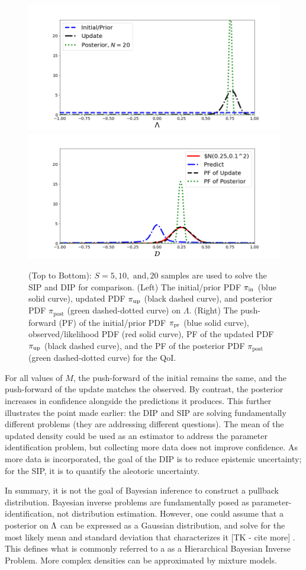 \begin{ex}
\begin{figure}[htbp]
   \includegraphics[width=0.49\linewidth]{figures/bip-vs-sip-20.png}
   \includegraphics[width=0.49\linewidth]{figures/bip-vs-sip-pf-20.png}
 \caption{(Top to Bottom): $S=5, 10, \text{ and}, 20$ samples are used to solve the SIP and DIP for comparison. (Left) The initial/prior PDF $\operatorname*{\pi_{in}}$ (blue solid curve), updated PDF $\operatorname*{\pi_{up}}$ (black dashed curve), and posterior PDF $\pi_\text{post}$ (green dashed-dotted curve) on $\Lambda$.
 (Right) The push-forward (PF) of the initial/prior PDF $\operatorname*{\pi_{pr}}$ (blue solid curve), observed/likelihood PDF (red solid curve), PF of the updated PDF $\operatorname*{\pi_{up}}$ (black dashed curve), and the PF of the posterior PDF $\pi_\text{post}$ (green dashed-dotted curve) for the QoI.}
 \label{fig:bayes-comparison-convergence}
\end{figure}

For all values of $M$, the push-forward of the initial remains the same, and the push-forward of the update matches the observed.
By contrast, the posterior increases in confidence alongside the predictions it produces.
This further illustrates the point made earlier: the DIP and SIP are solving fundamentally different problems (they are addressing different questions).
The mean of the updated density could be used as an estimator to address the parameter identification problem, but collecting more data does not improve confidence.
As more data is incorporated, the goal of the DIP is to reduce epistemic uncertainty; for the SIP, it is to quantify the aleotoric uncertainty.

\end{ex}





In summary, it is not the goal of Bayesian inference to construct a pullback distribution.
Bayesian inverse problems are fundamentally posed as parameter-identification, not distribution estimation.
However, one could assume that a posterior on ${\Lambda}$ can be expressed as a Gaussian distribution, and solve for the most likely mean and standard deviation that characterizes it [TK - cite more] \cite{Smith}.
This defines what is commonly referred to a as a Hierarchical Bayesian Inverse Problem.
More complex densities can be approximated by mixture models.


